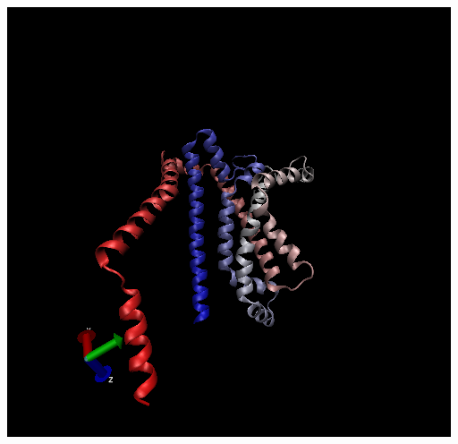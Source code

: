 \documentclass[
]{article}
\begin{document}
\includegraphics{predictedStructure.png}
\end{document}
